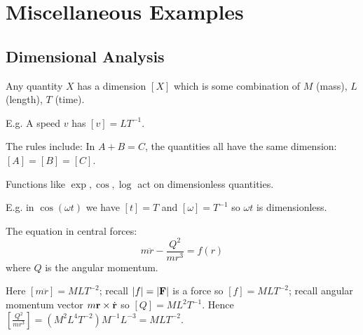 \documentclass[10pt, a4paper]{article}
\begin{document}
\newpage

\section{Miscellaneous Examples}

\subsection{Dimensional Analysis}
Any quantity $X$ has a dimension $[X]$ which is some combination of $M$
(mass),
$L$
(length),
$T$
(time).

E.g. A speed $v$ has $[v] = LT ^ {-1}$.

The rules include:
In $A + B = C$,
the quantities all have the same dimension:
$[A] = [B] = [C]$.

Functions like $\exp, \cos, \log$ act on dimensionless quantities.

E.g. in $\cos(\omega t)$ we have $[t] = T$ and $[\omega] = T ^ {-1}$ so $\omega t$ is dimensionless.

\begin{example}
    The equation in central forces:
    \[
    m\ddot{r} - \frac{Q ^ 2}{mr ^ 3} = f(r)
    \]
    where $Q$ is the angular momentum.
    
    Here $[m\ddot{r}] = MLT ^ {-2}$;
    recall $|f| = |\mathbf{F}|$ is a force so $[f] = MLT ^ {-2}$;
    recall angular momentum vector $m\mathbf{r}\times\dot{\mathbf{r}}$ so $[Q] = ML ^ 2T ^ {-1}$.
    Hence $\left[\frac{Q ^ 2}{mr ^ 3}\right] = (M ^ 2L ^ 4T ^ {-2})M ^ {-1}L ^ {-3} = MLT ^ {-2}$.
\end{example}
\end{document}
